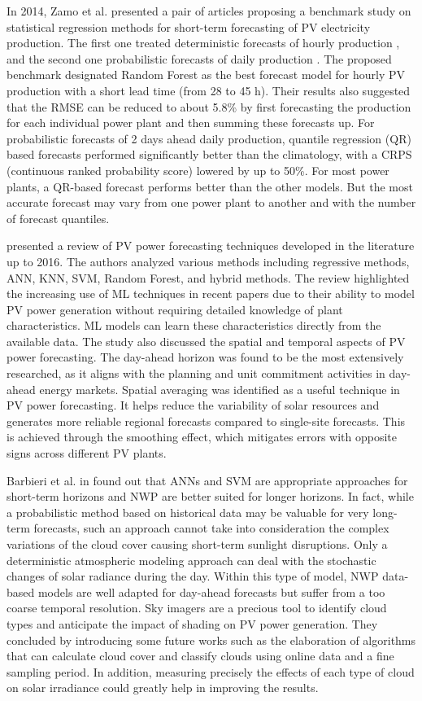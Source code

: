 In 2014, Zamo et al. presented a pair of articles proposing a benchmark study on statistical regression methods for short-term forecasting of PV electricity production.
The first one treated deterministic forecasts of hourly production \cite{ZAMO2014792}, and the second one probabilistic forecasts of daily production \cite{ZAMO2014804}.
The proposed benchmark designated Random Forest as the best forecast model for hourly PV production with a short lead time (from 28 to 45 h).
Their results also suggested that the RMSE can be reduced to about 5.8\% by first forecasting the production for each individual power plant and then summing these forecasts up.
For probabilistic forecasts of 2 days ahead daily production, quantile regression (QR) based forecasts performed significantly better than the climatology, with a CRPS (continuous ranked probability score) lowered by up to 50\%.
For most power plants, a QR-based forecast performs better than the other models.
But the most accurate forecast may vary from one power plant to another and with the number of forecast quantiles.

\cite{ANTONANZAS201678} presented a review of PV power forecasting techniques developed in the literature up to 2016.
The authors analyzed various methods including regressive methods, ANN, KNN, SVM, Random Forest, and hybrid methods.
The review highlighted the increasing use of ML techniques in recent papers due to their ability to model PV power generation without requiring detailed knowledge of plant characteristics.
ML models can learn these characteristics directly from the available data.
The study also discussed the spatial and temporal aspects of PV power forecasting.
The day-ahead horizon was found to be the most extensively researched, as it aligns with the planning and unit commitment activities in day-ahead energy markets.
Spatial averaging was identified as a useful technique in PV power forecasting.
It helps reduce the variability of solar resources and generates more reliable regional forecasts compared to single-site forecasts.
This is achieved through the smoothing effect, which mitigates errors with opposite signs across different PV plants.

Barbieri et al. in \cite{BARBIERI2017242} found out that ANNs and SVM are appropriate approaches for short-term horizons and NWP are better suited for longer horizons.
In fact, while a probabilistic method based on historical data may be valuable for very long-term forecasts, such an approach cannot take into consideration the complex variations of the cloud cover causing short-term sunlight disruptions.
Only a deterministic atmospheric modeling approach can deal with the stochastic changes of solar radiance during the day.
Within this type of model, NWP data-based models are well adapted for day-ahead forecasts but suffer from a too coarse temporal resolution.
Sky imagers are a precious tool to identify cloud types and anticipate the impact of shading on PV power generation.
They concluded by introducing some future works such as the elaboration of algorithms that can calculate cloud cover and classify clouds using online data and a fine sampling period.
In addition, measuring precisely the effects of each type of cloud on solar irradiance could greatly help in improving the results.

